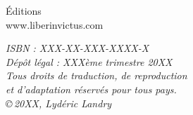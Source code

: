 \begin{center}
\begin{sffamily}
Éditions \\
www.liberinvictus.com
\end{sffamily}
\vfill
\thispagestyle{empty}
\footnotesize\itshape
\setlength{\parskip}{\baselineskip}
\setlength{\parindent}{0pt}
ISBN : XXX-XX-XXX-XXXX-X \\
Dépôt légal : XXXème trimestre 20XX\\
\bigskip
Tous droits de traduction, de reproduction \\
et d'adaptation réservés pour tous pays.\\
\bigskip
\copyright\,20XX, Lydéric Landry
\end{center}
\cleardoublepage
